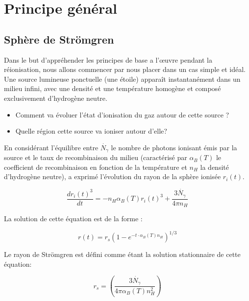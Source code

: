 \section{Principe général}

\subsection{Sphère de Strömgren}

Dans le but d’appréhender les principes de base a l’œuvre pendant la réionisation, nous allons commencer par nous placer dans un cas simple et idéal.
Une source lumineuse ponctuelle (une étoile) apparaît instantanément dans un milieu infini, avec une densité et une température homogène et composé exclusivement d’hydrogène neutre.

\begin{itemize}
\item Comment va évoluer l’état d'ionisation du gaz autour de cette source ?
\item Quelle région cette source va ioniser autour d'elle?
\end{itemize}

En considérant l'équilibre entre $\dot{N_\gamma}$ le nombre de photons ionisant émis par la source et le taux de recombinaison du milieu (caractérisé par $\alpha_B(T)$ le coefficient de recombinaison en fonction de la température et $n_H$ la densité d'hydrogène neutre), \cite{stromgren_physical_1939} a exprimé l'évolution du rayon de la sphère ionisée $r_i(t)$.


\begin{equation}
\frac{dr_i(t)^3}{dt} = -n_H \alpha_B(T)r_i (t)^3 + \frac{3 \dot{N_\gamma} }{4 \pi n_H}
\end{equation}


La solution de cette équation est de la forme :

\begin{equation}
r(t) = r_s \left( 1 - e^{-t\cdot \alpha_B(T) n_H } \right)^{1/3}
\end{equation}

%

Le rayon de Strömgren est défini comme étant la solution stationnaire de cette équation:

\begin{equation}
r_s = \left( \frac{3 \dot{N_\gamma} }{4 \pi \alpha_B(T) n_H^2} \right)
\end{equation}


